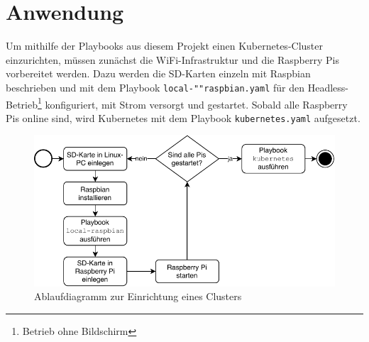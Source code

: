 \chapter{Anwendung}\label{ch:anwendung}

Um mithilfe der Playbooks aus diesem Projekt einen Kubernetes-Cluster einzurichten, müssen zunächst die WiFi-Infrastruktur und die Raspberry Pis vorbereitet werden.
Dazu werden die SD-Karten einzeln mit Raspbian beschrieben und mit dem Playbook \texttt{local-""raspbian.yaml} für den Headless-Betrieb\footnote{Betrieb ohne Bildschirm} konfiguriert, mit Strom versorgt und gestartet.
Sobald alle Raspberry Pis online sind, wird Kubernetes mit dem Playbook \texttt{kubernetes.yaml} aufgesetzt.

\begin{figure}[h]
    \centering
    \includegraphics[width=.7\textwidth]{img/anwendung.pdf}
    \caption{Ablaufdiagramm zur Einrichtung eines Clusters}
\end{figure}

